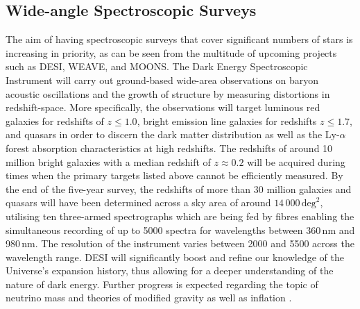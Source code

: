 \documentclass[a4paper,11pt]{article}
\begin{document}
\subsection{Wide-angle Spectroscopic Surveys} \label{spectrsurveys}
The aim of having spectroscopic surveys that cover significant numbers of stars is increasing in priority, as can be seen from the multitude of upcoming projects such as DESI, WEAVE, and MOONS. The Dark Energy Spectroscopic Instrument \citep[DESI;][]{desi} will carry out ground-based wide-area observations on baryon acoustic oscillations and the growth of structure by measuring distortions in redshift-space. More specifically, the observations will target luminous red galaxies for redshifts of $z\leq1.0$, bright emission line galaxies for redshifts $z\leq1.7$, and quasars in order to discern the dark matter distribution as well as the Ly-$\alpha$ forest absorption characteristics at high redshifts. The redshifts of around 10 million bright galaxies with a median redshift of $z\approx0.2$ will be acquired during times when the primary targets listed above cannot be efficiently measured. By the end of the five-year survey, the redshifts of more than 30 million galaxies and quasars will have been determined across a sky area of around $14\,000\,\mathrm{deg}^2$, utilising ten three-armed spectrographs which are being fed by fibres enabling the simultaneous recording of up to 5000 spectra for wavelengths between 360\,nm and 980\,nm. The resolution of the instrument varies between 2000 and 5500 across the wavelength range. DESI will significantly boost and refine our knowledge of the Universe's expansion history, thus allowing for a deeper understanding of the nature of dark energy. Further progress is expected regarding the topic of neutrino mass and theories of modified gravity as well as inflation \citep{desi}.\\ \\
%
\end{document}
